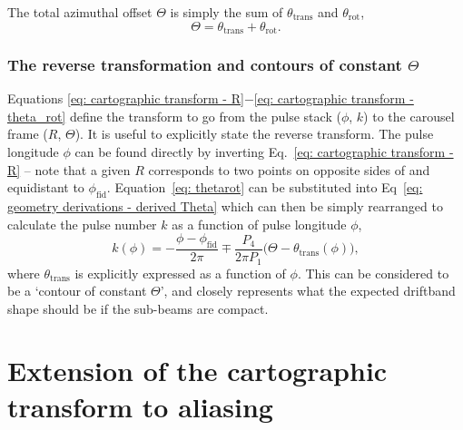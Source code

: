 The total azimuthal offset $\Theta$ is simply the sum of $\theta_\mathrm{trans}$ and $\theta_\mathrm{rot}$,
\begin{equation}
	\Theta = \theta_\mathrm{trans}+\theta_\mathrm{rot}.
    \label{eq: geometry derivations - derived Theta}
\end{equation}






\subsubsection{The reverse transformation and contours of constant \texorpdfstring{$\Theta$}{Theta}}
\label{app: geometry derivations - cartographic transforms - reverse transformation}

Equations \eqref{eq: cartographic transform - R}$-$\eqref{eq: cartographic transform - theta_rot} define the transform to go from the pulse stack ($\phi$, $k$) to the carousel frame ($R$, $\Theta$). It is useful to explicitly state the reverse transform. The pulse longitude $\phi$ can be found directly by inverting Eq.~\eqref{eq: cartographic transform - R} -- note that a given $R$ corresponds to two points on opposite sides of and equidistant to $\phi_\mathrm{fid}$. Equation~\eqref{eq: thetarot} can be substituted into Eq~\eqref{eq: geometry derivations - derived Theta} which can then be simply rearranged to calculate the pulse number $k$ as a function of pulse longitude $\phi$,
\begin{equation}
    \label{eq: geometry derivations - raw k as function of phi}
    k(\phi) = -\frac{\phi - \phi_\mathrm{fid}}{2\pi} \mp \frac{P_4}{2\pi P_1}\big(\Theta - \theta_\mathrm{trans}(\phi) \big),
\end{equation}
where $\theta_\mathrm{trans}$ is explicitly expressed as a function of $\phi$. This can be considered to be a `contour of constant $\Theta$', and closely represents what the expected driftband shape should be if the sub-beams are compact.


















\section{Extension of the cartographic transform to aliasing}
\label{app: geometry derivations - aliasing}

